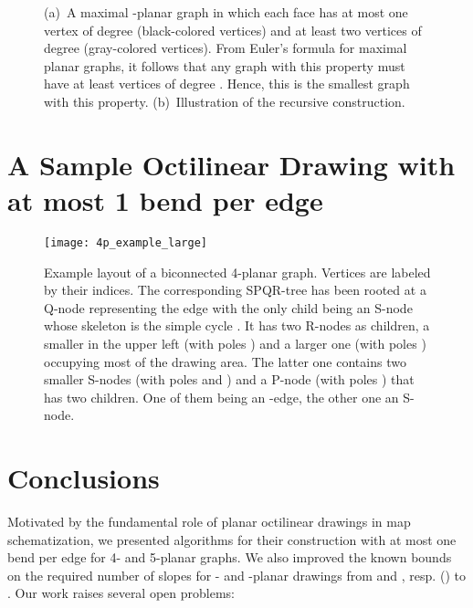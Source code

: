 \documentclass[a4paper,twoside,11pt]{article}
\begin{document}
\begin{figure}[t]
    \centering
    \begin{minipage}[b]{.48\textwidth}
        \centering
    \end{minipage}
    \begin{minipage}[b]{.48\textwidth}
        \centering
    \end{minipage}
    \caption{(a)~A maximal -planar graph in which each face has at most one vertex of degree  (black-colored vertices) and at least two vertices of degree  (gray-colored vertices).
    From Euler's formula for maximal planar graphs, it follows that any graph with this property must have at least  vertices of degree .
    Hence, this is the smallest graph with this property.
    (b)~Illustration of the recursive construction.}
    \label{fig:6p_twobends_construction}
\end{figure}

\section{A Sample Octilinear Drawing with at most 1 bend per edge}
\label{sec:sample}


\begin{figure}[h!]
    \centering
    \texttt{[image: 4p\_example\_large]}
    \caption{Example layout of a biconnected 4-planar graph. Vertices are labeled by their indices. The
    corresponding SPQR-tree  has been rooted at a Q-node
    representing the edge  with the only child being an
    S-node whose skeleton is the simple cycle .
    It has two R-nodes as children, a smaller in the upper left (with
    poles ) and a larger one (with poles ) occupying most of the drawing area. The latter
    one contains two smaller S-nodes (with poles 
    and ) and a P-node (with poles ) that has two children. One of them being an
    -edge, the other one an S-node.}
    \label{fig:4p_example_large}
\end{figure}

\section{Conclusions}
\label{sec:conclusions}


Motivated by the fundamental role of planar octilinear
drawings in map schematization, we presented algorithms for their construction
with at most one bend per edge for 4- and 5-planar graphs.
We also improved the known bounds on the required number of slopes
for - and -planar drawings from  and , resp.
(\cite{KPP13}) to . Our work raises several open problems:
\end{document}
